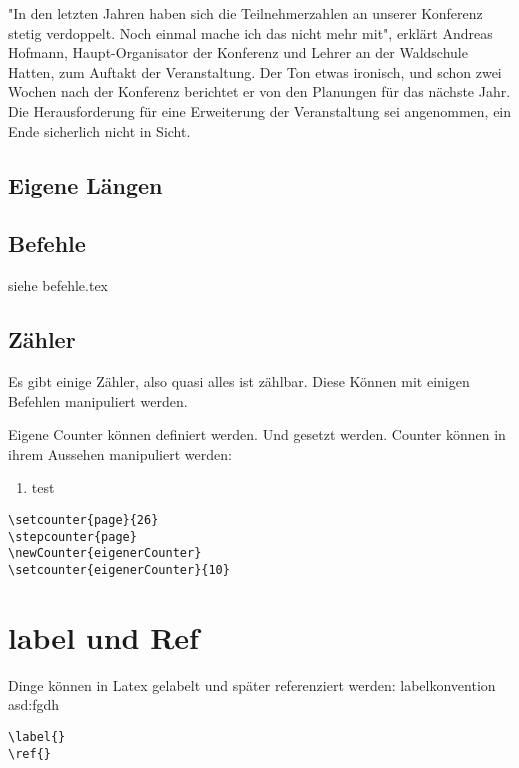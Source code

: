 \addtolength{\parindent}{1in}
\begin{flushleft}
	
	
	"In den letzten Jahren haben sich die Teilnehmerzahlen an unserer Konferenz stetig verdoppelt. Noch
	einmal mache ich das nicht mehr mit", erklärt Andreas Hofmann, Haupt-Organisator der Konferenz und
	Lehrer an der Waldschule Hatten, zum Auftakt der Veranstaltung. Der Ton etwas ironisch, und schon
	zwei Wochen nach der Konferenz berichtet er von den Planungen für das nächste Jahr. Die
	Herausforderung für eine Erweiterung der Veranstaltung sei angenommen, ein Ende sicherlich nicht in
	Sicht.
\end{flushleft}
\subsection{Eigene Längen}

\subsection{Befehle}

siehe befehle.tex

\subsection{Zähler}
\setlength{\parindent}{3ex}


Es gibt einige Zähler, also quasi alles ist zählbar. Diese Können mit einigen Befehlen manipuliert werden. 


Eigene Counter können definiert werden.
Und gesetzt werden. 
\setcounter{eigenerCounter}{2}
Counter können in ihrem Aussehen manipuliert werden:

\begin{enumerate}
	
	
	\renewcommand{\theenumi}{\alph{enumi}}
	\item test
	
\end{enumerate}

\begin{lstlisting}
\setcounter{page}{26}
\stepcounter{page}
\newCounter{eigenerCounter}
\setcounter{eigenerCounter}{10}
\end{lstlisting}

\section{label und Ref}

Dinge können in Latex gelabelt und später referenziert werden: labelkonvention asd:fgdh
\begin{lstlisting}
\label{}
\ref{}
\end{lstlisting}



